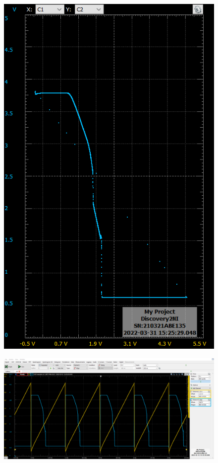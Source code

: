 \documentclass[10pt, a4paper, italian]{article}
\begin{document}
\begin{figure}
	\includegraphics[scale=0.4]{not_xy1}
\end{figure}
\begin{figure}
	\includegraphics[width=\textwidth]{not_time1}
\end{figure}
\end{document}
